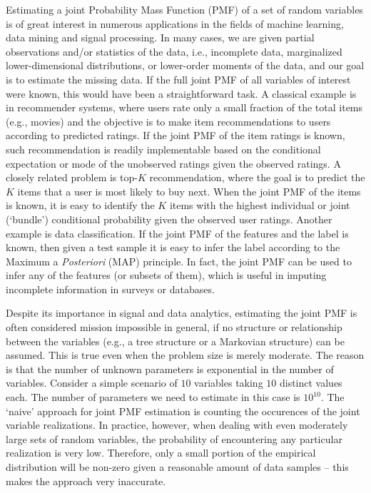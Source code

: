 \documentclass[journal]{IEEEtran}
\begin{document}
Estimating a joint Probability Mass Function (PMF) of a set of random variables is of great interest in numerous applications in the fields of machine learning, data mining and signal processing.  In many cases, we are given partial observations and/or statistics of the data, i.e., incomplete data, marginalized lower-dimensional distributions, or lower-order moments of the data, and our goal is to estimate the missing data. If the full joint PMF of all variables of interest were known, this would have been a straightforward task.  A classical example is in recommender systems, where users rate only a small fraction of the total items (e.g., movies) and the objective is to make item recommendations to users according to predicted ratings. If the joint PMF of the item ratings is known, such recommendation is readily implementable based on the conditional expectation or mode of the unobserved ratings given the observed ratings. A closely related problem is top-$K$ recommendation, where the goal is to predict the $K$ items that a user is most likely to buy next. When the joint PMF of the items is known, it is easy to identify the $K$ items with the highest individual or joint (`bundle') conditional probability given the observed user ratings. Another example is data classification. If the joint PMF of the features and the label is known, then given a test sample it is easy to infer the label according to the Maximum a \textit{Posteriori} (MAP) principle.  In fact, the joint PMF can be used to infer any of the features (or subsets of them), which is useful in imputing incomplete information in surveys or databases.

Despite its importance in signal and data analytics, estimating the joint PMF is often considered mission impossible in general, if no structure or relationship between the variables (e.g., a tree structure or a Markovian structure) can be assumed.
This is true even when the problem size is merely moderate. The reason is that the number of unknown parameters is exponential in the number of variables. Consider a simple scenario of $10$ variables taking $10$ distinct values each. The number of parameters we need to estimate in this case is $10^{10}$. The `naive' approach for joint PMF estimation is counting the occurences of the joint variable realizations. In practice, however, when dealing with even moderately large sets of random variables, the probability of encountering any particular realization is very low. Therefore, only a small portion of the empirical distribution will be non-zero given a reasonable amount of data samples -- this makes the approach very inaccurate.
\end{document}
